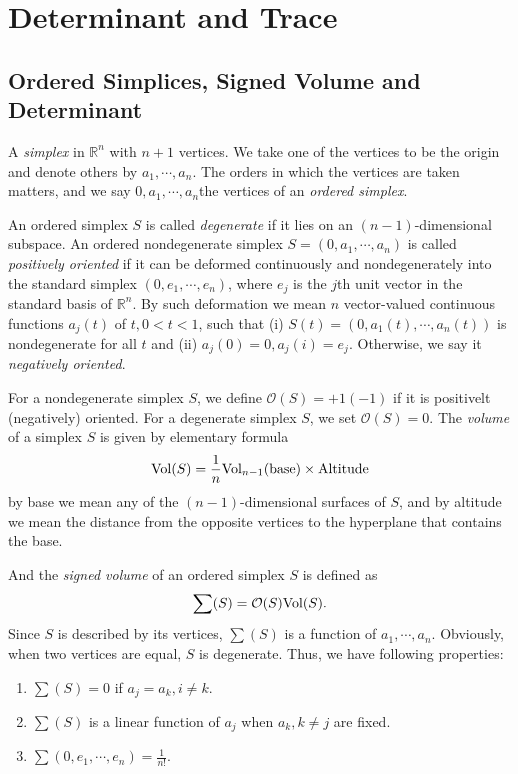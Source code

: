 \documentclass[11pt]{book}
\theoremstyle{definition}
\numberwithin{equation}{subsection}
\begin{document}
\chapter{Determinant and Trace}
\section{Ordered Simplices, Signed Volume and Determinant}
A \emph{simplex} in $\mathbb{R}^n$ with $n+1$ vertices. We take one of the vertices to be the origin and denote others by $a_1,\cdots, a_n$. The orders in which the vertices are taken matters, and we say $0, a_1,\cdots, a_n$the vertices of an \emph{ordered simplex}.

An ordered simplex $S$ is called \emph{degenerate} if it lies on an $(n-1)$-dimensional subspace. An ordered nondegenerate simplex $S = (0, a_1,\cdots, a_n)$ is called \emph{positively oriented} if it can be deformed continuously and nondegenerately into the standard simplex $(0, e_1,\cdots, e_n)$, where $e_j$ is the $j$th unit vector in the standard basis of $\mathbb{R}^n$. By such deformation we mean $n$ vector-valued continuous functions $a_j(t)$ of $t,0 < t < 1$, such that (i) $S(t) = (0,a_1(t),\cdots, a_n(t))$ is nondegenerate for all $t$ and (ii) $a_j(0) = 0, a_j(i) = e_j$. 
Otherwise, we say it \emph{negatively oriented}. 

For a nondegenerate simplex $S$, we define $\mathcal{O}(S) = +1(-1)$ if it is positivelt (negatively) oriented. For a degenerate simplex $S$, we set $\mathcal{O}(S) = 0$. The \emph{volume} of a simplex $S$ is given by elementary formula
\begin{align*}
    {\rm Vol}(S) = \frac{1}{n} {\rm Vol}_{n-1}({\rm base}) \times {\rm Altitude}
\end{align*}
by base we mean any of the $(n-1)$-dimensional surfaces of $S$, and by altitude we mean the distance from the opposite vertices to the hyperplane that contains the base. 

And the \emph{signed volume} of an ordered simplex $S$ is defined as 
\begin{align*}
    \sum (S) = \mathcal{O}(S){\rm Vol}(S).
\end{align*}
Since $S$ is described by its vertices, $\sum (S)$ is a function of $a_1,\cdots,a_n$. Obviously, when two vertices are equal, $S$ is degenerate. Thus, we have following properties:
\begin{enumerate}[label=(\roman*)]
    \item $\sum (S) = 0$ if $a_j = a_k, i\neq k$.
    \item $\sum (S)$ is a linear function of $a_j$ when $a_k, k\neq j$ are fixed.
    \item $\sum (0,e_1,\cdots,e_n) = \frac{1}{n!}$.
\end{enumerate}
\end{document}
